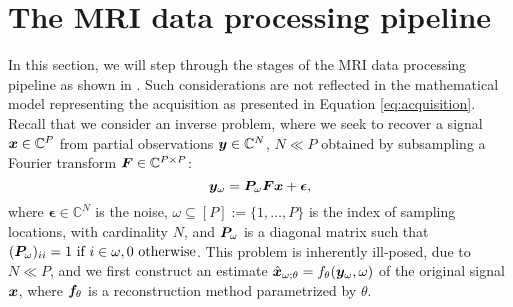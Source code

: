 

\section{The MRI data processing pipeline}\label{sec:pipeline}
In this section, we will step through the stages of the MRI data processing pipeline as shown in . Such considerations are not reflected in the mathematical model representing the acquisition as presented in Equation \ref{eq:acquisition}. Recall that we consider an inverse problem, where we seek to recover a signal ${\bm{x}} \in \mathbb{C}^P$ from partial observations ${\bm{y}} \in \mathbb{C}^N$, $N\ll P$ obtained by subsampling a Fourier transform ${\bm{F}}\in \mathbb{C}^{P\times P}$:
\begin{equation}
{\bm{y}}_\omega = {\bm{P}}_\omega{\bm{F}}{\bm{x}} + \boldsymbol{\epsilon}, \label{eq:acquisition2}    
\end{equation}
where $\boldsymbol{\epsilon} \in \mathbb{C}^N$ is the noise, $\omega \subseteq [P]:=\{1,\ldots, P\}$ is the index of sampling locations, with cardinality $N$, and ${\bm{P}}_\omega$ is a diagonal matrix such that $({\bm{P}}_\omega)_{ii}=1 \text{ if } i \in \omega, 0 \text{ otherwise}$. This problem is inherently ill-posed, due to $N \ll P$, and we first construct an estimate $\hat{{\bm{x}}}_{\omega;\theta}=f_\theta({\bm{y}}_\omega,\omega)$ of the original signal ${\bm{x}}$, where ${\bm{f}}_\theta$ is a reconstruction method parametrized by $\theta$. 


